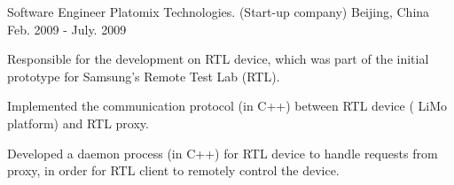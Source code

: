 \begin{cventries}
  \cventry
    {Software Engineer} %
    {Platomix Technologies. (Start-up company)} %
    {Beijing, China} %
    {Feb. 2009 - July. 2009} %
    {
      \begin{cvitems} %
        \item {Responsible for the
    development on RTL device, which was part of the initial prototype for
    Samsung's Remote Test Lab (RTL).}
       \item {Implemented the communication protocol (in C++) between RTL device (
    LiMo platform) and RTL proxy.}
       \item {Developed a daemon process (in C++) for RTL
    device to handle requests from proxy, in order for RTL client
    to remotely control the device.}
      \end{cvitems}
    }

\end{cventries}
